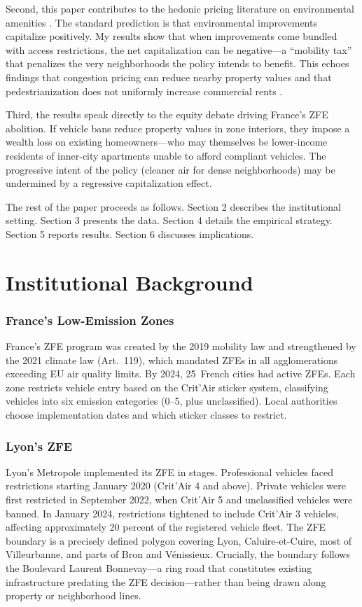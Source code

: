 \documentclass[12pt]{article}
\begin{document}
Second, this paper contributes to the hedonic pricing literature on environmental amenities \citep{rosen1974hedonic, palmquist2005property}. The standard prediction is that environmental improvements capitalize positively. My results show that when improvements come bundled with access restrictions, the net capitalization can be negative---a ``mobility tax'' that penalizes the very neighborhoods the policy intends to benefit. This echoes findings that congestion pricing can reduce nearby property values \citep{gibson2019effects} and that pedestrianization does not uniformly increase commercial rents \citep{geoghegan1998cost}.

Third, the results speak directly to the equity debate driving France's ZFE abolition. If vehicle bans reduce property values in zone interiors, they impose a wealth loss on existing homeowners---who may themselves be lower-income residents of inner-city apartments unable to afford compliant vehicles. The progressive intent of the policy (cleaner air for dense neighborhoods) may be undermined by a regressive capitalization effect.

The rest of the paper proceeds as follows. Section 2 describes the institutional setting. Section 3 presents the data. Section 4 details the empirical strategy. Section 5 reports results. Section 6 discusses implications.


\section{Institutional Background}

\subsubsection*{France's Low-Emission Zones} France's ZFE program was created by the 2019 mobility law and strengthened by the 2021 climate law (Art.~119), which mandated ZFEs in all agglomerations exceeding EU air quality limits. By 2024, 25~French cities had active ZFEs. Each zone restricts vehicle entry based on the Crit'Air sticker system, classifying vehicles into six emission categories (0--5, plus unclassified). Local authorities choose implementation dates and which sticker classes to restrict.

\subsubsection*{Lyon's ZFE} Lyon's Metropole implemented its ZFE in stages. Professional vehicles faced restrictions starting January 2020 (Crit'Air 4 and above). Private vehicles were first restricted in September 2022, when Crit'Air 5 and unclassified vehicles were banned. In January 2024, restrictions tightened to include Crit'Air 3 vehicles, affecting approximately 20 percent of the registered vehicle fleet. The ZFE boundary is a precisely defined polygon covering Lyon, Caluire-et-Cuire, most of Villeurbanne, and parts of Bron and V\'enissieux. Crucially, the boundary follows the Boulevard Laurent Bonnevay---a ring road that constitutes existing infrastructure predating the ZFE decision---rather than being drawn along property or neighborhood lines.
\end{document}
